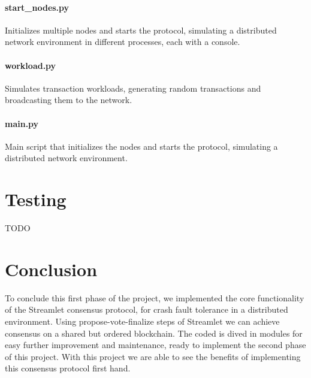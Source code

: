 \paragraph{start\_nodes.py}
Initializes multiple nodes and starts the protocol, simulating a distributed network environment in different processes, each with a console.

\paragraph{workload.py}
Simulates transaction workloads, generating random transactions and broadcasting them to the network.

\paragraph{main.py}
Main script that initializes the nodes and starts the protocol, simulating a distributed network environment.

\clearpage

\section{Testing}

TODO

\section{Conclusion}

To conclude this first phase of the project, we implemented the core functionality of the Streamlet consensus protocol, for crash fault tolerance in a distributed environment. Using propose-vote-finalize steps of Streamlet we can achieve consensus on a shared but ordered blockchain. The coded is dived in modules for easy further improvement and maintenance, ready to implement the second phase of this project. With this project we are able to see the benefits of implementing this consensus protocol first hand.

